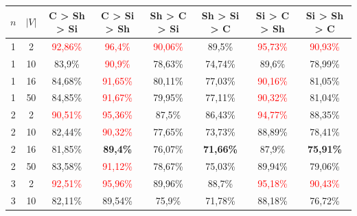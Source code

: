 \begin{table}[ht]
    \centering
    \begin{tabular}{cc|c|c|c|c|c|c}
        \toprule
        $n$ & $|V|$ & \textbf{C > Sh > Si}     & \textbf{C > Si > Sh}     & \textbf{Sh > C > Si}     & \textbf{Sh > Si > C} & \textbf{Si > C > Sh}     & \textbf{Si > Sh > C}     \\\midrule
        {1} & {2}   & \textcolor{red}{92,86\%} & \textcolor{red}{96,4\%}  & \textcolor{red}{90,06\%} & {89,5\%}             & \textcolor{red}{95,73\%} & \textcolor{red}{90,93\%} \\
        {1} & {10}  & {83,9\%}                 & \textcolor{red}{90,9\%}  & {78,63\%}                & {74,74\%}            & {89,6\%}                 & {78,99\%}                \\
        {1} & {16}  & {84,68\%}                & \textcolor{red}{91,65\%} & {80,11\%}                & {77,03\%}            & \textcolor{red}{90,16\%} & {81,05\%}                \\
        {1} & {50}  & {84,85\%}                & \textcolor{red}{91,67\%} & {79,95\%}                & {77,11\%}            & \textcolor{red}{90,32\%} & {81,04\%}                \\
        {2} & {2}   & \textcolor{red}{90,51\%} & \textcolor{red}{95,36\%} & {87,5\%}                 & {86,43\%}            & \textcolor{red}{94,77\%} & {88,35\%}                \\
        {2} & {10}  & {82,44\%}                & \textcolor{red}{90,32\%} & {77,65\%}                & {73,73\%}            & {88,89\%}                & {78,41\%}                \\
        {2} & {16}  & {81,85\%}                & \textbf{89,4\%}          & {76,07\%}                & \textbf{71,66\%}     & {87,9\%}                 & \textbf{75,91\%}         \\
        {2} & {50}  & {83,58\%}                & \textcolor{red}{91,12\%} & {78,67\%}                & {75,03\%}            & {89,94\%}                & {79,06\%}                \\
        {3} & {2}   & \textcolor{red}{92,51\%} & \textcolor{red}{95,96\%} & {89,96\%}                & {88,7\%}             & \textcolor{red}{95,18\%} & \textcolor{red}{90,43\%} \\
        {3} & {10}  & {82,11\%}                & {89,54\%}                & {75,9\%}                 & {71,78\%}            & {88,18\%}                & {76,72\%}                \\

\end{tabular}
\end{table}

